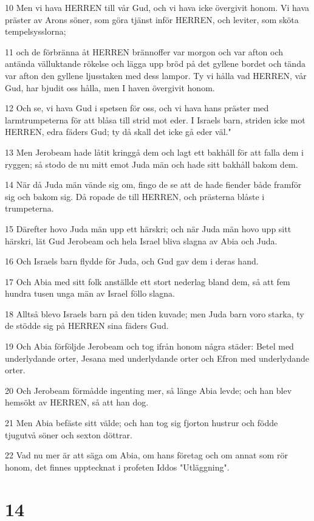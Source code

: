 \par 10 Men vi hava HERREN till vår Gud, och vi hava icke övergivit honom. Vi hava präster av Arons söner, som göra tjänst inför HERREN, och leviter, som sköta tempelsysslorna;
\par 11 och de förbränna åt HERREN brännoffer var morgon och var afton och antända välluktande rökelse och lägga upp bröd på det gyllene bordet och tända var afton den gyllene ljusstaken med dess lampor. Ty vi hålla vad HERREN, vår Gud, har bjudit oss hålla, men I haven övergivit honom.
\par 12 Och se, vi hava Gud i spetsen för oss, och vi hava hans präster med larmtrumpeterna för att blåsa till strid mot eder. I Israels barn, striden icke mot HERREN, edra fäders Gud; ty då skall det icke gå eder väl."
\par 13 Men Jerobeam hade låtit kringgå dem och lagt ett bakhåll för att falla dem i ryggen; så stodo de nu mitt emot Juda män och hade sitt bakhåll bakom dem.
\par 14 När då Juda män vände sig om, fingo de se att de hade fiender både framför sig och bakom sig. Då ropade de till HERREN, och prästerna blåste i trumpeterna.
\par 15 Därefter hovo Juda män upp ett härskri; och när Juda män hovo upp sitt härskri, lät Gud Jerobeam och hela Israel bliva slagna av Abia och Juda.
\par 16 Och Israels barn flydde för Juda, och Gud gav dem i deras hand.
\par 17 Och Abia med sitt folk anställde ett stort nederlag bland dem, så att fem hundra tusen unga män av Israel föllo slagna.
\par 18 Alltså blevo Israels barn på den tiden kuvade; men Juda barn voro starka, ty de stödde sig på HERREN sina fäders Gud.
\par 19 Och Abia förföljde Jerobeam och tog ifrån honom några städer: Betel med underlydande orter, Jesana med underlydande orter och Efron med underlydande orter.
\par 20 Och Jerobeam förmådde ingenting mer, så länge Abia levde; och han blev hemsökt av HERREN, så att han dog.
\par 21 Men Abia befäste sitt välde; och han tog sig fjorton hustrur och födde tjugutvå söner och sexton döttrar.
\par 22 Vad nu mer är att säga om Abia, om hans företag och om annat som rör honom, det finnes upptecknat i profeten Iddos "Utläggning".

\chapter{14}

